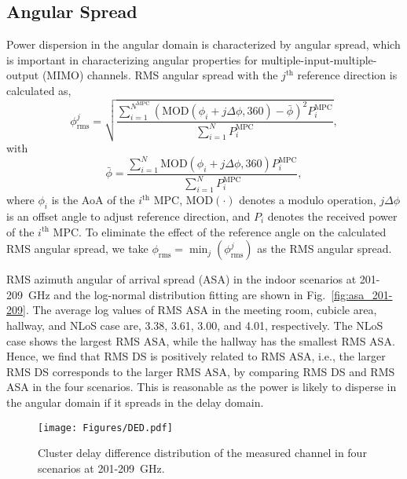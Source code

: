 \documentclass[journal,12pt,draftclsnofoot,onecolumn]{IEEEtran}
\begin{document}
\subsection{Angular Spread}\label{sec:channel_asa}
Power dispersion in the angular domain is characterized by angular spread, which is important in characterizing angular properties for multiple-input-multiple-output (MIMO) channels. RMS angular spread with the $j^{\textrm{th}}$ reference direction is calculated as, 
    \begin{equation}
    \phi^j_{\text{rms}}=\sqrt{\frac{\sum^{N^{\text{MPC}}}_{i=1}(\text{MOD}(\phi_i+j\Delta\phi,360)-\bar\phi)^2 P^{\text{MPC}}_i}{\sum^{N}_{i=1}P^{\text{MPC}}_i}},
    \end{equation}
    with
    \begin{equation}
    \bar\phi=\frac{\sum^{N}_{i=1}\text{MOD}(\phi_i+j\Delta\phi,360) P^{\text{MPC}}_i}{\sum^{N}_{i=1}P^{\text{MPC}}_i},
    \end{equation}
where $\phi_i$ is the AoA of the $i^{\text{th}}$ MPC, $\text{MOD}(\cdot)$ denotes a modulo operation, $j\Delta\phi$ is an offset angle to adjust reference direction, and $P_i$ denotes the received power of the $i^{\text{th}}$ MPC. To eliminate the effect of the reference angle on the calculated RMS angular spread, we take $\phi_{\text{rms}}=\min_j({\phi^j_{\text{rms}}})$ as the RMS angular spread.
\par RMS azimuth angular of arrival spread (ASA) in the indoor scenarios at 201-209~GHz and the log-normal distribution fitting are shown in Fig.~\ref{fig:asa_201-209}. The average log values of RMS ASA in the meeting room, cubicle area, hallway, and NLoS case are, 3.38, 3.61, 3.00, and 4.01, respectively. The NLoS case shows the largest RMS ASA, while the hallway has the smallest RMS ASA. Hence, we find that RMS DS is positively related to RMS ASA, i.e., the larger RMS DS corresponds to the larger RMS ASA, by comparing RMS DS and RMS ASA in the four scenarios. This is reasonable as the power is likely to disperse in the angular domain if it spreads in the delay domain.


\begin{figure}
\centering
\texttt{[image: Figures/DED.pdf]}
\caption{Cluster delay difference distribution of the measured channel in four scenarios at 201-209~GHz.}
\label{fig:CDD_201-209}
\end{figure}
\end{document}
